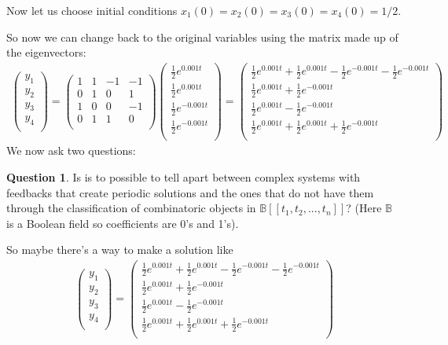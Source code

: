 \documentclass{article}
\theoremstyle{definition}
\newtheorem{question}{Question}
\begin{document}
Now let us choose initial conditions $x_1(0)=x_2(0)=x_3(0)=x_4(0)=1/2$.\par
So now we can change back to the original variables using the matrix made up of the eigenvectors:
\begin{align*}
    \begin{pmatrix}
y_1 \\
y_2 \\
y_3 \\
y_4 \\
\end{pmatrix}=
\begin{pmatrix}
1 & 1 & -1 & -1 \\
0 & 1 & 0 & 1 \\
1 & 0 & 0 & -1 \\
0 & 1 & 1 & 0 \\
\end{pmatrix}
\begin{pmatrix}
\frac{1}{2}e^{0.001t} \\
\frac{1}{2}e^{0.001t} \\
\frac{1}{2}e^{-0.001t} \\
\frac{1}{2}e^{-0.001t} \\
\end{pmatrix}
=
\begin{pmatrix}
\frac{1}{2}e^{0.001t} + \frac{1}{2}e^{0.001t} - \frac{1}{2}e^{-0.001t} - \frac{1}{2}e^{-0.001t} \\
\frac{1}{2}e^{0.001t} + \frac{1}{2}e^{-0.001t} \\
\frac{1}{2}e^{0.001t} - \frac{1}{2}e^{-0.001t} \\
\frac{1}{2}e^{0.001t} + \frac{1}{2}e^{0.001t} + \frac{1}{2}e^{-0.001t} \\
\end{pmatrix}
\end{align*}
We now ask two questions:
\begin{question}
    \item Is is to possible to tell apart between complex systems with feedbacks that create periodic solutions and the ones that do not have them through the classification of combinatoric objects in $\mathbb B[[t_1,t_2,...,t_n]]$? (Here $\mathbb B$ is a Boolean field so coefficients are 0's and 1's).
    \end{question}
So maybe there's a way to make a solution like
\begin{align*}
    \begin{pmatrix}
y_1 \\
y_2 \\
y_3 \\
y_4 \\
\end{pmatrix}=
\begin{pmatrix}
\frac{1}{2}e^{0.001t} + \frac{1}{2}e^{0.001t} - \frac{1}{2}e^{-0.001t} - \frac{1}{2}e^{-0.001t} \\
\frac{1}{2}e^{0.001t} + \frac{1}{2}e^{-0.001t} \\
\frac{1}{2}e^{0.001t} - \frac{1}{2}e^{-0.001t} \\
\frac{1}{2}e^{0.001t} + \frac{1}{2}e^{0.001t} + \frac{1}{2}e^{-0.001t} \\
\end{pmatrix}
\end{align*}
\end{document}
